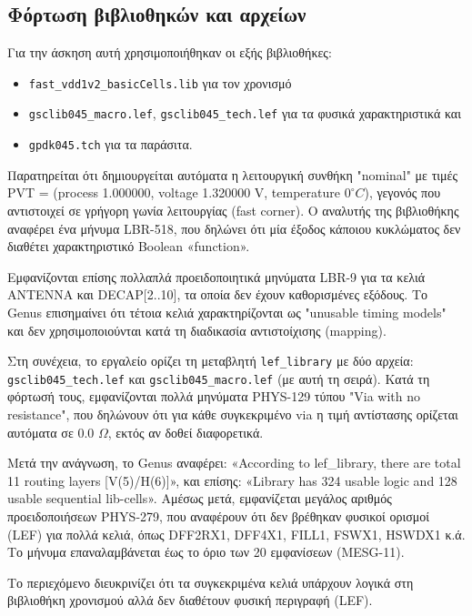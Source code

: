 \subsection{Φόρτωση βιβλιοθηκών και αρχείων}

Για την άσκηση αυτή χρησιμοποιήθηκαν οι εξής βιβλιοθήκες:
\begin{itemize}
    \item \texttt{fast\_vdd1v2\_basicCells.lib} για τον χρονισμό
    \item \texttt{gsclib045\_macro.lef}, \texttt{gsclib045\_tech.lef} για τα φυσικά χαρακτηριστικά και
    \item \texttt{gpdk045.tch} για τα παράσιτα.
\end{itemize}

Παρατηρείται ότι δημιουργείται αυτόματα η λειτουργική συνθήκη "nominal" με τιμές PVT = (process 1.000000, voltage 1.320000 V, temperature $0^{\circ}C$), γεγονός που αντιστοιχεί σε γρήγορη γωνία λειτουργίας (fast corner).
Ο αναλυτής της βιβλιοθήκης αναφέρει ένα μήνυμα LBR-518, που δηλώνει ότι μία έξοδος κάποιου κυκλώματος δεν διαθέτει χαρακτηριστικό Boolean «function».

Εμφανίζονται επίσης πολλαπλά προειδοποιητικά μηνύματα LBR-9 για τα κελιά ANTENNA και DECAP[2..10], τα οποία δεν έχουν καθορισμένες εξόδους.
Το Genus επισημαίνει ότι τέτοια κελιά χαρακτηρίζονται ως "unusable timing models" και δεν χρησιμοποιούνται κατά τη διαδικασία αντιστοίχισης (mapping).

Στη συνέχεια, το εργαλείο ορίζει τη μεταβλητή \texttt{lef\_library} με δύο αρχεία: \texttt{gsclib045\_tech.lef} και \texttt{gsclib045\_macro.lef} (με αυτή τη σειρά).
Κατά τη φόρτωσή τους, εμφανίζονται πολλά μηνύματα PHYS-129 τύπου "Via with no resistance", που δηλώνουν ότι για κάθε συγκεκριμένο via η τιμή αντίστασης ορίζεται αυτόματα σε 0.0 $\Omega$, εκτός αν δοθεί διαφορετικά.

Μετά την ανάγνωση, το Genus αναφέρει: «According to lef\_library, there are total 11 routing layers [V(5)/H(6)]», και επίσης: «Library has 324 usable logic and 128 usable sequential lib-cells».
Αμέσως μετά, εμφανίζεται μεγάλος αριθμός προειδοποιήσεων PHYS-279, που αναφέρουν ότι δεν βρέθηκαν φυσικοί ορισμοί (LEF) για πολλά κελιά, όπως DFF2RX1, DFF4X1, FILL1, FSWX1, HSWDX1 κ.ά.
Το μήνυμα επαναλαμβάνεται έως το όριο των 20 εμφανίσεων (MESG-11).

Το περιεχόμενο διευκρινίζει ότι τα συγκεκριμένα κελιά υπάρχουν λογικά στη βιβλιοθήκη χρονισμού αλλά δεν διαθέτουν φυσική περιγραφή (LEF).


